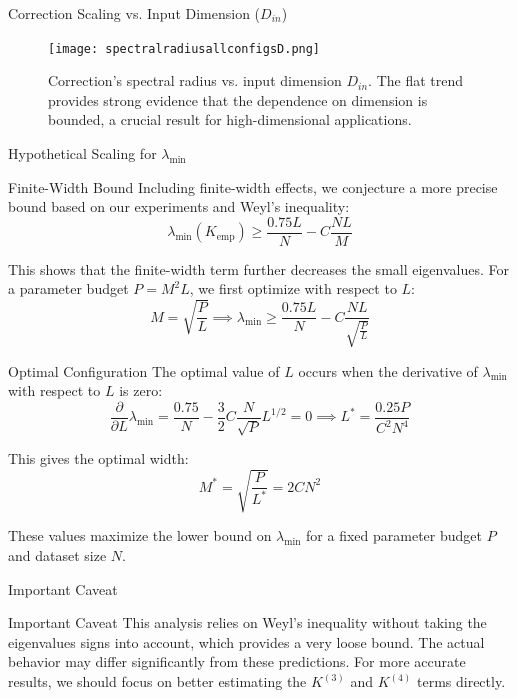 \documentclass{beamer}
\begin{document}
\begin{frame}{Correction Scaling vs. Input Dimension ($D_{in}$)}
    \begin{figure}
        \centering
        \texttt{[image: spectralradiusallconfigsD.png]}
        \caption{Correction's spectral radius vs. input dimension $D_{in}$. The flat trend provides strong evidence that the dependence on dimension is bounded, a crucial result for high-dimensional applications.}
    \end{figure}
\end{frame}


\begin{frame}{Hypothetical Scaling for $\lambda_{\min}$}
\begin{alertblock}{Finite-Width Bound}
Including finite-width effects, we conjecture a more precise bound based on our experiments and Weyl's inequality:
\[ \lambda_{\min}(K_{\text{emp}}) \ge \frac{0.75L}{N} - C \frac{NL}{M} \]
\end{alertblock}
This shows that the finite-width term further decreases the small eigenvalues.
For a parameter budget $P = M^2L$, we first optimize with respect to $L$:
\[
M = \sqrt{\frac{P}{L}} \implies \lambda_{\min} \ge \frac{0.75L}{N} - C \frac{NL}{\sqrt{\frac{P}{L}}} 
\]
\end{frame}

\begin{frame}{Optimal Configuration}
The optimal value of $L$ occurs when the derivative of $\lambda_{\min}$ with respect to $L$ is zero:
\[
\frac{\partial}{\partial L} \lambda_{\min} = \frac{0.75}{N} - \frac{3}{2} C \frac{N}{\sqrt{P}} L^{1/2} = 0 \implies L^* = \frac{0.25 P}{C^2 N^4}
\]

This gives the optimal width:
\[
M^* = \sqrt{\frac{P}{L^*}} = 2 C N^2
\]

These values maximize the lower bound on $\lambda_{\min}$ for a fixed parameter budget $P$ and dataset size $N$.

\end{frame}

\begin{frame}{Important Caveat}
\begin{alertblock}{Important Caveat}
This analysis relies on Weyl's inequality without taking the eigenvalues signs into account, which provides a very loose bound. The actual behavior may differ significantly from these predictions. For more accurate results, we should focus on better estimating the $K^{(3)}$ and $K^{(4)}$ terms directly.
\end{alertblock}
\end{frame}
\end{document}
